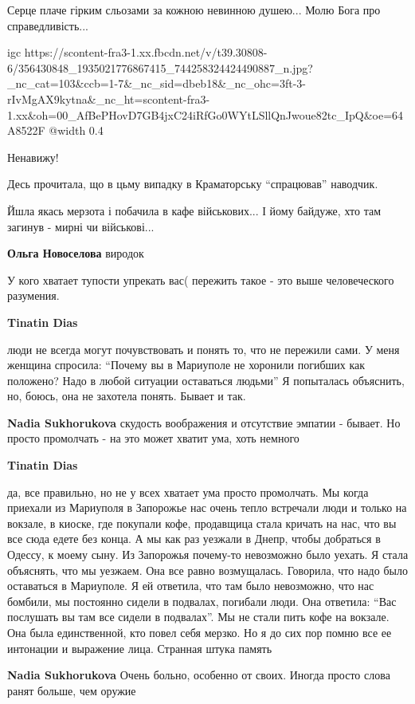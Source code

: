 
Серце плаче гірким сльозами за кожною невинною душею... Молю Бога про справедливість...

\ifcmt
  igc https://scontent-fra3-1.xx.fbcdn.net/v/t39.30808-6/356430848_1935021776867415_744258324424490887_n.jpg?_nc_cat=103&ccb=1-7&_nc_sid=dbeb18&_nc_ohc=3ft-3-rIvMgAX9kytna&_nc_ht=scontent-fra3-1.xx&oh=00_AfBePHovD7GB4jxC24iRfGo0WYtLSllQnJwoue82tc_IpQ&oe=64A8522F
	@width 0.4
\fi


Ненавижу!


Десь прочитала, що в цьму випадку в Краматорську \enquote{спрацював} наводчик.

Йшла якась мерзота і побачила в кафе військових... І йому байдуже, хто там
загинув - мирні чи військові...

\begin{itemize} %
\textbf{Ольга Новоселова} виродок
\end{itemize} %


У кого хватает тупости упрекать вас( пережить такое - это выше человеческого разумения.

\begin{itemize} %
\textbf{Tinatin Dias} 

люди не всегда могут почувствовать и понять то, что не пережили сами. У меня
женщина спросила: \enquote{Почему вы в Мариуполе не хоронили погибших как положено?
Надо в любой ситуации оставаться людьми} Я попыталась объяснить, но, боюсь, она
не захотела понять. Бывает и так.

\textbf{Nadia Sukhorukova} скудость воображения и отсутствие эмпатии - бывает. Но просто промолчать - на это может хватит ума, хоть немного

\textbf{Tinatin Dias} 

да, все правильно, но не у всех хватает ума просто промолчать. Мы когда
приехали из Мариуполя в Запорожье нас очень тепло встречали люди и только на
вокзале, в киоске, где покупали кофе, продавщица стала кричать на нас, что вы
все сюда едете без конца. А мы как раз уезжали в Днепр, чтобы добраться в
Одессу, к моему сыну. Из Запорожья почему-то невозможно было уехать. Я стала
объяснять, что мы уезжаем. Она все равно возмущалась. Говорила, что надо было
оставаться в Мариуполе. Я ей ответила, что там было невозможно, что нас
бомбили, мы постоянно сидели в подвалах, погибали люди. Она ответила: \enquote{Вас
послушать вы там все сидели в подвалах}. Мы не стали пить кофе на вокзале. Она
была единственной, кто повел себя мерзко. Но я до сих пор помню все ее
интонации и выражение лица. Странная штука память

\textbf{Nadia Sukhorukova} Очень больно, особенно от своих. Иногда просто слова ранят больше, чем оружие

\end{itemize} %

